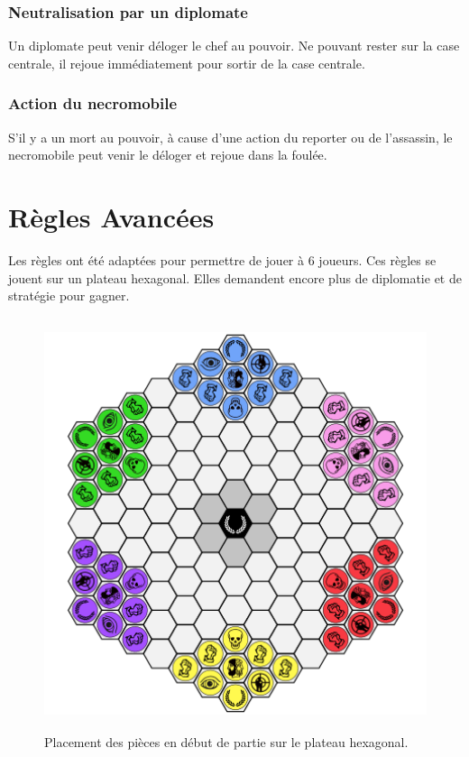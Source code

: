 \documentclass{article}
\begin{document}
\subsubsection{Neutralisation par un diplomate}
Un diplomate peut venir déloger le chef au pouvoir. Ne pouvant rester sur la case centrale, il rejoue immédiatement pour sortir de la case centrale.

\subsubsection{Action du necromobile}
S'il y a un mort au pouvoir, à cause d'une action du reporter ou de l'assassin, le necromobile peut venir le déloger et rejoue dans la foulée.

\newpage


\section{Règles Avancées}

Les règles ont été adaptées pour permettre de jouer à 6 joueurs.
Ces règles se jouent sur un plateau hexagonal. Elles demandent encore plus de diplomatie et de stratégie pour gagner.

\vspace{20pt} %


\begin{figure}[ht]
\centering
\includegraphics[width=4.75972in,height=4.76111in]{media/dja_6_tablier.png}
\caption{Placement des pièces en début de partie sur le plateau hexagonal.}
\end{figure}
\end{document}
